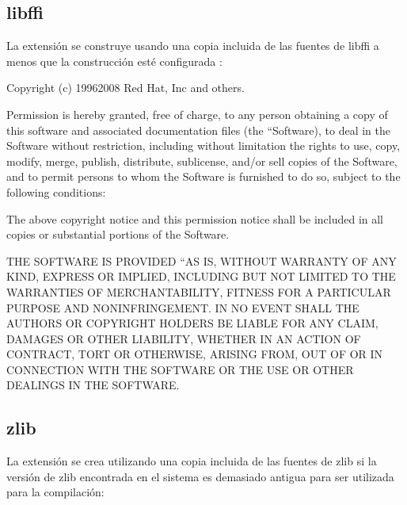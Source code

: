 \documentclass[a4,10pt,spanish]{sphinxmanual}
\begin{document}
\subsection{libffi}
\label{\detokenize{license:libffi}}
\sphinxAtStartPar
La extensión  se construye usando una copia incluida de las fuentes de libffi a menos que la construcción esté configurada :

\begin{sphinxVerbatim}[commandchars=\\\{\}]
Copyright (c) 1996\PYGZhy{}2008  Red Hat, Inc and others.

Permission is hereby granted, free of charge, to any person obtaining
a copy of this software and associated documentation files (the
``Software\PYGZsq{}\PYGZsq{}), to deal in the Software without restriction, including
without limitation the rights to use, copy, modify, merge, publish,
distribute, sublicense, and/or sell copies of the Software, and to
permit persons to whom the Software is furnished to do so, subject to
the following conditions:

The above copyright notice and this permission notice shall be included
in all copies or substantial portions of the Software.

THE SOFTWARE IS PROVIDED ``AS IS\PYGZsq{}\PYGZsq{}, WITHOUT WARRANTY OF ANY KIND,
EXPRESS OR IMPLIED, INCLUDING BUT NOT LIMITED TO THE WARRANTIES OF
MERCHANTABILITY, FITNESS FOR A PARTICULAR PURPOSE AND
NONINFRINGEMENT.  IN NO EVENT SHALL THE AUTHORS OR COPYRIGHT
HOLDERS BE LIABLE FOR ANY CLAIM, DAMAGES OR OTHER LIABILITY,
WHETHER IN AN ACTION OF CONTRACT, TORT OR OTHERWISE, ARISING FROM,
OUT OF OR IN CONNECTION WITH THE SOFTWARE OR THE USE OR OTHER
DEALINGS IN THE SOFTWARE.
\end{sphinxVerbatim}


\subsection{zlib}
\label{\detokenize{license:zlib}}
\sphinxAtStartPar
La extensión  se crea utilizando una copia incluida de las fuentes de zlib si la versión de zlib encontrada en el sistema es demasiado antigua para ser utilizada para la compilación:
\end{document}
